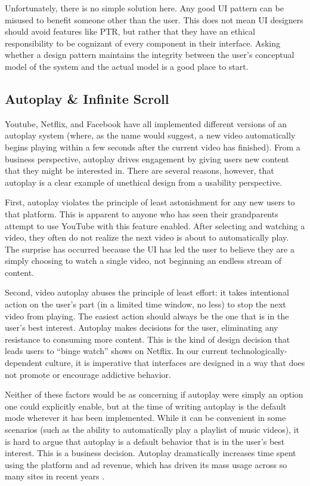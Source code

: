 \documentclass[12pt, oneside]{article}
\begin{document}
Unfortunately, there is no simple solution here. Any good UI pattern can be misused to benefit someone other than the user. This does not mean UI designers should avoid features like PTR, but rather that they have an ethical responsibility to be cognizant of every component in their interface. Asking whether a design pattern maintains the integrity between the user's conceptual model of the system and the actual model is a good place to start.

\subsection{Autoplay \& Infinite Scroll}

Youtube, Netflix, and Facebook have all implemented different versions of an autoplay system (where, as the name would suggest, a new video automatically begins playing within a few seconds after the current video has finished). From a business perspective, autoplay drives engagement by giving users new content that they might be interested in. There are several reasons, however, that autoplay is a clear example of unethical design from a usability perspective.

First, autoplay violates the principle of least astonishment for any new users to that platform. This is apparent to anyone who has seen their grandparents attempt to use YouTube with this feature enabled. After selecting and watching a video, they often do not realize the next video is about to automatically play. The surprise has occurred because the UI has led the user to believe they are a simply choosing to watch a single video, not beginning an endless stream of content.

Second, video autoplay abuses the principle of least effort: it takes intentional action on the user's part (in a limited time window, no less) to stop the next video from playing. The easiest action should always be the one that is in the user's best interest. Autoplay makes decisions for the user, eliminating any resistance to consuming more content. This is the kind of design decision that leads users to ``binge watch'' shows on Netflix. In our current technologically- dependent culture, it is imperative that interfaces are designed in a way that does not promote or encourage addictive behavior.

Neither of these factors would be as concerning if autoplay were simply an option one could explicitly enable, but at the time of writing autoplay is the default mode wherever it has been implemented. While it can be convenient in some scenarios (such as the ability to automatically play a playlist of music videos), it is hard to argue that autoplay is a default behavior that is in the user's best interest. This is a business decision. Autoplay dramatically increases time spent using the platform and ad revenue, which has driven its mass usage across so many sites in recent years \cite{moses_2017}.
\end{document}
